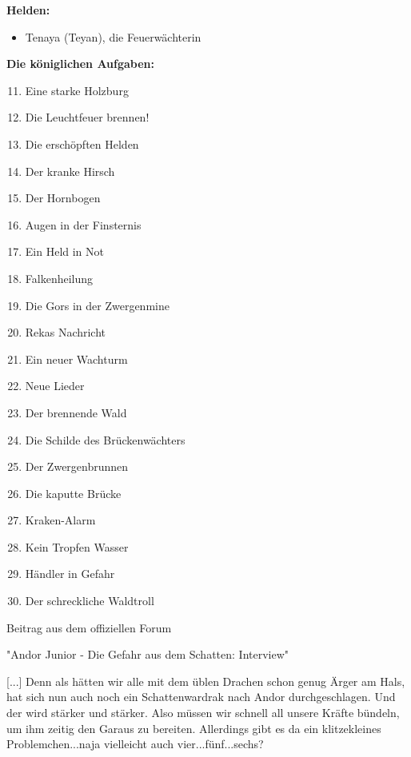 \documentclass[10pt, a4paper, oneside]{book}
\begin{document}
\begin{multicols}{2}
\textbf{Helden:}
\begin{itemize}[topsep=0pt,itemsep=-1ex,partopsep=1ex,parsep=1ex]
    \item Tenaya (Teyan), die Feuerwächterin\bigskip
\end{itemize}

\textbf{Die königlichen Aufgaben:}


\begin{enumerate}[topsep=0pt,itemsep=-1ex,partopsep=1ex,parsep=1ex]
    \setcounter{enumi}{10}
    \item Eine starke Holzburg
    \item Die Leuchtfeuer brennen!
    \item Die erschöpften Helden
    \item Der kranke Hirsch
    \item Der Hornbogen
    \item Augen in der Finsternis
    \item Ein Held in Not
    \item Falkenheilung
    \item Die Gors in der Zwergenmine
    \item Rekas Nachricht
    \item Ein neuer Wachturm
    \item Neue Lieder
    \item Der brennende Wald
    \item Die Schilde des Brückenwächters
    \item Der Zwergenbrunnen
    \item Die kaputte Brücke
    \item Kraken-Alarm
    \item Kein Tropfen Wasser
    \item Händler in Gefahr
    \item Der schreckliche Waldtroll
\end{enumerate}
 

\begin{center}
    Beitrag aus dem offiziellen Forum

    "Andor Junior - Die Gefahr aus dem Schatten: Interview"
\end{center}

[...] Denn als hätten wir alle mit dem üblen Drachen schon genug Ärger am Hals, hat sich nun auch noch ein Schattenwardrak nach Andor durchgeschlagen. Und der wird stärker und stärker. Also müssen wir schnell all unsere Kräfte bündeln, um ihm zeitig den Garaus zu bereiten. Allerdings gibt es da ein klitzekleines Problemchen...naja vielleicht auch vier...fünf...sechs?


\end{multicols}
\end{document}
